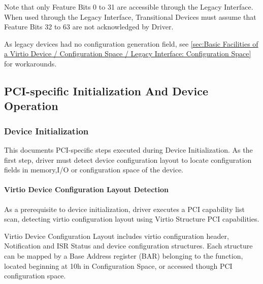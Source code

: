 Note that only Feature Bits 0 to 31 are accessible through the
Legacy Interface. When used through the Legacy Interface,
Transitional Devices must assume that Feature Bits 32 to 63
are not acknowledged by Driver.

As legacy devices had no configuration generation field,
see \ref{sec:Basic Facilities of a Virtio Device / Configuration Space / Legacy Interface: Configuration Space}~ for workarounds.

\subsection{PCI-specific Initialization And Device Operation}\label{sec:Virtio Transport Options / Virtio Over PCI Bus / PCI-specific Initialization And Device Operation}

\subsubsection{Device Initialization}\label{sec:Virtio Transport Options / Virtio Over PCI Bus / PCI-specific Initialization And Device Operation / Device Initialization}

This documents PCI-specific steps executed during Device Initialization.
As the first step, driver must detect device configuration layout
to locate configuration fields in memory,I/O or configuration space of the
device.

\paragraph{Virtio Device Configuration Layout Detection}\label{sec:Virtio Transport Options / Virtio Over PCI Bus / PCI-specific Initialization And Device Operation / Device Initialization / Virtio Device Configuration Layout Detection}

As a prerequisite to device initialization, driver executes a
PCI capability list scan, detecting virtio configuration layout using Virtio
Structure PCI capabilities.

Virtio Device Configuration Layout includes virtio configuration header, Notification
and ISR Status and device configuration structures.
Each structure can be mapped by a Base Address register (BAR) belonging to
the function, located beginning at 10h in Configuration Space,
or accessed though PCI configuration space.

